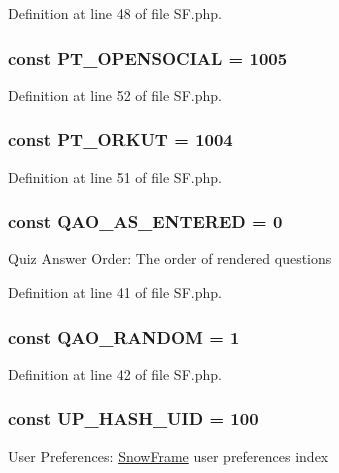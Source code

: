 Definition at line 48 of file SF.php.

\hypertarget{classSF_a07ad1f7c2b80fbcab3550bfc7ff9fcb4}{
\subsubsection[{PT\_\-OPENSOCIAL}]{\setlength{\rightskip}{0pt plus 5cm}const {\bf PT\_\-OPENSOCIAL} = 1005}}
\label{classSF_a07ad1f7c2b80fbcab3550bfc7ff9fcb4}


Definition at line 52 of file SF.php.

\hypertarget{classSF_aefc31cd8062b5d277a253b83b34804e8}{
\subsubsection[{PT\_\-ORKUT}]{\setlength{\rightskip}{0pt plus 5cm}const {\bf PT\_\-ORKUT} = 1004}}
\label{classSF_aefc31cd8062b5d277a253b83b34804e8}


Definition at line 51 of file SF.php.

\hypertarget{classSF_a765b7752897066d1b31803b5c242615f}{
\subsubsection[{QAO\_\-AS\_\-ENTERED}]{\setlength{\rightskip}{0pt plus 5cm}const {\bf QAO\_\-AS\_\-ENTERED} = 0}}
\label{classSF_a765b7752897066d1b31803b5c242615f}
Quiz Answer Order: The order of rendered questions 

Definition at line 41 of file SF.php.

\hypertarget{classSF_aa7dc78abec7a46baca89375311bbeae4}{
\subsubsection[{QAO\_\-RANDOM}]{\setlength{\rightskip}{0pt plus 5cm}const {\bf QAO\_\-RANDOM} = 1}}
\label{classSF_aa7dc78abec7a46baca89375311bbeae4}


Definition at line 42 of file SF.php.

\hypertarget{classSF_a971fec4a94c055f1e9cfbb6108b186a8}{
\subsubsection[{UP\_\-HASH\_\-UID}]{\setlength{\rightskip}{0pt plus 5cm}const {\bf UP\_\-HASH\_\-UID} = 100}}
\label{classSF_a971fec4a94c055f1e9cfbb6108b186a8}
User Preferences: \hyperlink{classSnowFrame}{SnowFrame} user preferences index 

